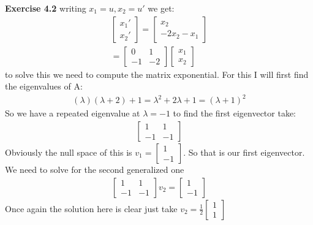 \documentclass[12pt]{article}
\newenvironment{exercise}[1]{\vspace{.1in}\noindent\textbf{Exercise #1 \hspace{.05em}}}{}
\theoremstyle{definition}
\theoremstyle{remark}
\begin{document}
\begin{exercise}{4.2}
	writing $x_1=u,x_2=u'$ we get:
	\begin{align}
		\begin{bmatrix}
			x_1' \\
			x_2'
		\end{bmatrix}   =\begin{bmatrix}
			                 x_2 \\
			                 -2x_2-x_1
		                 \end{bmatrix} \\
		=%
		\begin{bmatrix}
			0  & 1  \\
			-1 & -2
		\end{bmatrix}  %
		\begin{bmatrix}
			x_1 \\
			x_2
		\end{bmatrix}
	\end{align}
	to solve this  we need to compute the matrix exponential. For this I will first find the eigenvalues of A:
	\begin{align}
		(\lambda)(\lambda+2)+1=\lambda^2+2\lambda+1=(\lambda+1)^2
	\end{align}
	So we have a repeated eigenvalue at $\lambda=-1$ to find the first eigenvector take:
	\begin{align}
		\begin{bmatrix}
			1  & 1  \\
			-1 & -1
		\end{bmatrix}
	\end{align}
	Obviously the null space of this is $v_1=%
		\begin{bmatrix}
			1 \\
			-1
		\end{bmatrix}$. So that is our first eigenvector. We need to solve for the second generalized one
	\begin{align}
		\begin{bmatrix}
			1  & 1  \\
			-1 & -1
		\end{bmatrix}v_2=%
		\begin{bmatrix}
			1 \\
			-1
		\end{bmatrix}
	\end{align}
	Once again the solution here is clear just take $v_2=\frac{1}{2}%
		\begin{bmatrix}
			1 \\
			1
		\end{bmatrix}$


\end{exercise}
\end{document}
